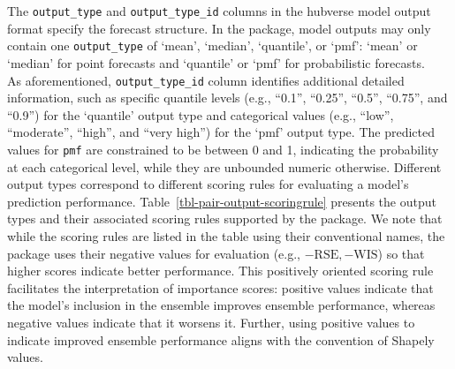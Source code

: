 \documentclass[
  article,
  shortnames,
  notitle]{jss}
\begin{document}
The \texttt{output\_type} and \texttt{output\_type\_id} columns in the
hubverse model output format specify the forecast structure. In the
 package, model outputs may only contain one
\texttt{output\_type} of `mean', `median', `quantile', or `pmf': `mean'
or `median' for point forecasts and `quantile' or `pmf' for
probabilistic forecasts.\\
As aforementioned, \texttt{output\_type\_id} column identifies
additional detailed information, such as specific quantile levels (e.g.,
``0.1'', ``0.25'', ``0.5'', ``0.75'', and ``0.9'') for the `quantile'
output type and categorical values (e.g., ``low'', ``moderate'',
``high'', and ``very high'') for the `pmf' output type. The predicted
values for \texttt{pmf} are constrained to be between 0 and 1,
indicating the probability at each categorical level, while they are
unbounded numeric otherwise. Different output types correspond to
different scoring rules for evaluating a model's prediction performance.
Table~\ref{tbl-pair-output-scoringrule} presents the output types and
their associated scoring rules supported by the 
package. We note that while the scoring rules are listed in the table
using their conventional names, the package uses their negative values
for evaluation (e.g., \(-\text{RSE}, -\text{WIS}\)) so that higher
scores indicate better performance. This positively oriented scoring
rule facilitates the interpretation of importance scores: positive
values indicate that the model's inclusion in the ensemble improves
ensemble performance, whereas negative values indicate that it worsens
it. Further, using positive values to indicate improved ensemble
performance aligns with the convention of Shapely values.

\begin{table}


\caption{\label{tbl-pair-output-scoringrule}Pairs of output types and
their associated scoring rules for evaluating prediction performance.}

\end{table}%
\end{document}
